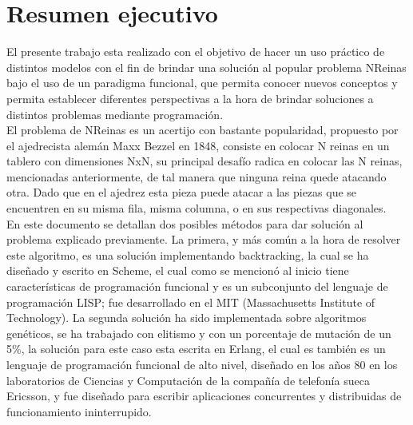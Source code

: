 \documentclass[12pt,a4paper]{article}
\begin{document}
\section{Resumen ejecutivo}
\bigskip
 El presente trabajo esta realizado con el objetivo de hacer un uso práctico de distintos modelos con el fin de brindar una solución al popular problema NReinas bajo el uso de un paradigma funcional, que permita conocer nuevos conceptos y permita establecer diferentes perspectivas a la hora de brindar soluciones a distintos problemas mediante programación. \\
 	
 El problema de NReinas es un acertijo con bastante popularidad, propuesto por el ajedrecista alemán Maxx Bezzel en 1848, consiste en colocar N reinas en un tablero con dimensiones NxN, su principal desafío radica en colocar las N reinas, mencionadas anteriormente, de tal manera que ninguna reina quede atacando otra. Dado que en el ajedrez esta pieza puede atacar a las piezas que se encuentren en su misma fila, misma columna, o en sus respectivas diagonales. \\
 	
 En este documento se detallan dos posibles métodos para dar solución al problema explicado previamente. La primera, y más común a la hora de resolver este algoritmo, es una solución implementando backtracking, la cual se ha diseñado y escrito en Scheme, el cual como se mencionó al inicio tiene características de programación funcional y es un subconjunto del lenguaje de programación LISP; fue desarrollado en el MIT (Massachusetts Institute of Technology). La segunda solución ha sido implementada sobre algoritmos genéticos, se ha trabajado con elitismo y con un porcentaje de mutación de un 5\%, la solución para este caso esta escrita en Erlang, el cual es también es un lenguaje de programación funcional de alto nivel, diseñado en los años 80 en los laboratorios de Ciencias y Computación de la compañía de telefonía sueca Ericsson, y fue diseñado para escribir aplicaciones concurrentes y distribuidas de funcionamiento ininterrupido. \\
 	
\end{document}
